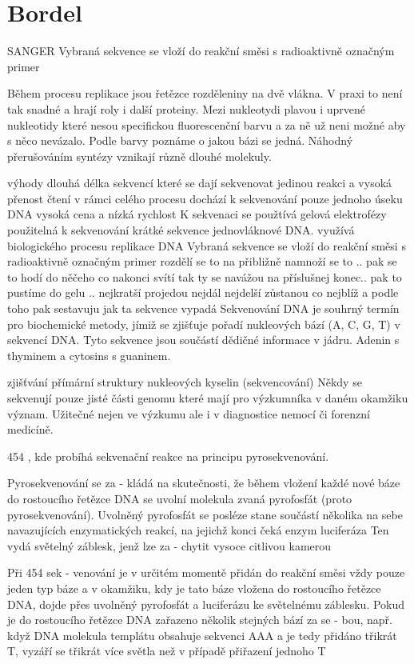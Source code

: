\documentclass[czech,DP]{thesiskiv}
\begin{document}
\section{Bordel}
SANGER
Vybraná sekvence se vloží do reakční směsi s radioaktivně označným primer  

Během procesu replikace jsou řetězce rozděleniny na dvě vlákna. 
V praxi to není tak snadné a hrají roly i další proteiny. 
Mezi nukleotydi plavou i uprvené nukleotidy které nesou specifickou fluorescenční barvu a za ně už neni možné aby s něco nevázalo.  Podle barvy poznáme o jakou bázi se jedná. 
Náhodný přerušováním syntézy vznikají různě dlouhé molekuly. 

výhody dlouhá délka sekvencí které se dají sekvenovat jedinou reakci a vysoká přenost čtení
v rámci celého procesu dochází k sekvenování pouze jednoho úseku DNA 
vysoká cena a nízká rychlost
 K sekvenaci se použtívá gelová elektrofézy
 použitelná k sekvenování krátké sekvence jednovláknové DNA. 
 využívá biologického procesu replikace DNA
 Vybraná sekvence se vloží do reakční směsi s radioaktivně označným primer
 rozdělí se to na přibližně 
 namnoží se to .. 
 pak se to hodí do něčeho co nakonci svítí tak ty se navážou na příslušnej konec.. 
 pak to pustíme do gelu .. 
 nejkratší projedou nejdál
 nejdelší zůstanou co nejblíž a podle toho pak sestavuju jak ta sekvence vypadá
Sekvenování DNA je souhrný termín pro biochemické metody, jímiž se zjišťuje pořadí nukleových bází (A, C, G, T) v sekvencí DNA. Tyto sekvence jsou součástí dědičné informace v jádru.
Adenin s thyminem a cytosins s guaninem.

zjišťvání přímární struktury nukleových kyselin (sekvencování)
Někdy se sekvenují pouze jisté části genomu které mají pro výzkumníka v daném okamžiku význam.
Užitečné nejen ve výzkumu ale i v diagnostice nemocí či forenzní medicíně. 


454 
, kde probíhá sekvenační reakce na principu pyrosekvenování.  

 Pyrosekvenování se za -
kládá na skutečnosti, že během vložení
každé nové báze do rostoucího řetězce
DNA se uvolní molekula zvaná pyrofosfát
(proto pyrosekvenování). Uvolněný pyrofosfát se posléze stane součástí několika
na sebe navazujících enzymatických reakcí, na jejichž konci čeká enzym luciferáza
Ten vydá světelný záblesk, jenž lze za -
chytit vysoce citlivou kamerou


 Při 454 sek -
venování je v určitém momentě přidán do
reakční směsi vždy pouze jeden typ báze
a v okamžiku, kdy je tato báze vložena do
rostoucího řetězce DNA, dojde přes uvolněný pyrofosfát a luciferázu ke světelnému
záblesku. Pokud je do rostoucího řetězce
DNA zařazeno několik stejných bází za se -
bou, např. když DNA molekula templátu
obsahuje sekvenci AAA a je tedy přidáno
třikrát T, vyzáří se třikrát více světla než
v případě přiřazení jednoho T
\end{document}
